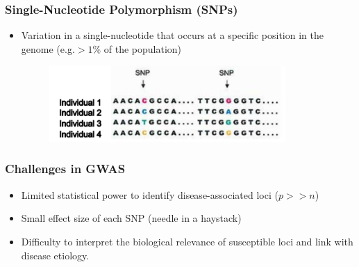 \documentclass[table]{beamer}
\begin{document}
\begin{frame}
\frametitle{Single-Nucleotide Polymorphism (SNPs)}
\begin{itemize}
  \item Variation in a single-nucleotide that occurs at a specific position in the genome (e.g.$>1\%$ of the population)
  \begin{figure}[htbp]
    \centering
    \includegraphics[width=0.85\textwidth]{SNP.png}
  \end{figure}
\end{itemize}
\end{frame}

\begin{frame}
\frametitle{Challenges in GWAS}
\begin{itemize}
  \item Limited statistical power to identify disease-associated loci ($p >> n$)
  \bigskip
  \item Small effect size of each SNP (needle in a haystack)
  \bigskip
  \item Difficulty to interpret the biological relevance of susceptible loci and link with disease etiology.
\end{itemize}
\end{frame}
\end{document}
